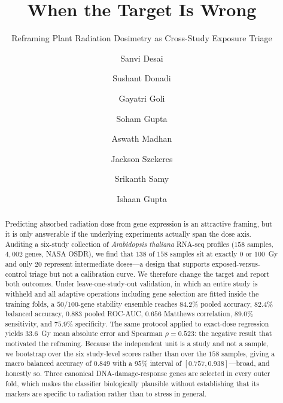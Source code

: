\documentclass[manuscript,nonacm]{acmart}
\begin{document}
\title{When the Target Is Wrong}
\subtitle{Reframing Plant Radiation Dosimetry as Cross-Study Exposure Triage}

\author{Sanvi Desai}
\equalcontrib
{}

\author{Sushant Donadi}
\equalcontribmark
{}

\author{Gayatri Goli}
\equalcontribmark
{}

\author{Soham Gupta}
\equalcontribmark
{}

\author{Aswath Madhan}
\equalcontribmark
{}

\author{Jackson Szekeres}
\equalcontribmark
{}

\author{Srikanth Samy}

\author{Ishaan Gupta}

\begin{abstract}
Predicting absorbed radiation dose from gene expression is an attractive framing, but it
is only answerable if the underlying experiments actually span the dose axis. Auditing a
six-study collection of \emph{Arabidopsis thaliana} RNA-seq profiles ($158$ samples,
$4{,}002$ genes, NASA OSDR), we find that $138$ of $158$ samples sit at exactly $0$ or
$100$~Gy and only $20$ represent intermediate doses---a design that supports
exposed-versus-control triage but not a calibration curve. We therefore change the
target and report both outcomes. Under leave-one-study-out validation, in which an
entire study is withheld and all adaptive operations including gene selection are fitted
inside the training folds, a $50/100$-gene stability ensemble reaches $84.2\%$ pooled
accuracy, $82.4\%$ balanced accuracy, $0.883$ pooled ROC-AUC, $0.656$ Matthews
correlation, $89.0\%$ sensitivity, and $75.9\%$ specificity. The same protocol applied to
exact-dose regression yields $33.6$~Gy mean absolute error and Spearman $\rho=0.523$: the
negative result that motivated the reframing. Because the independent unit is a study
and not a sample, we bootstrap over the six study-level scores rather than over the $158$
samples, giving a macro balanced accuracy of $0.849$ with a $95\%$ interval of
$[0.757, 0.938]$---broad, and honestly so. Three canonical DNA-damage-response genes are
selected in every outer fold, which makes the classifier biologically plausible without
establishing that its markers are specific to radiation rather than to stress in general.
\end{abstract}
\end{document}
